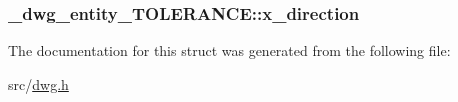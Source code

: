 \hypertarget{struct__dwg__entity__TOLERANCE_a0cb87d726bd67cc1502267dd2379a485}{
\subsubsection[{x\-\_\-direction}]{ {\bf \-\_\-dwg\-\_\-entity\-\_\-\-T\-O\-L\-E\-R\-A\-N\-C\-E\-::x\-\_\-direction}}}\label{struct__dwg__entity__TOLERANCE_a0cb87d726bd67cc1502267dd2379a485}


\-The documentation for this struct was generated from the following file\-:\begin{DoxyCompactItemize}
\item 
src/\hyperlink{dwg_8h}{dwg.\-h}\end{DoxyCompactItemize}
